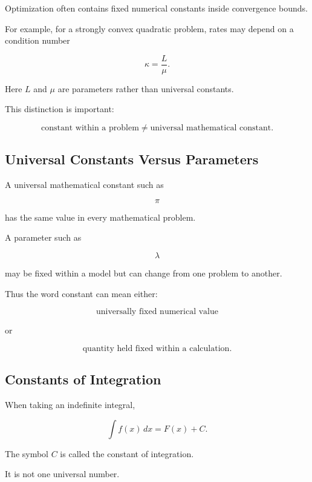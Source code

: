 Optimization often contains fixed numerical constants inside convergence
bounds.

For example, for a strongly convex quadratic problem, rates may depend on a
condition number

\[
\boxed{
\kappa
=
\frac{L}{\mu}.
}
\]

Here \(L\) and \(\mu\) are parameters rather than universal constants.

This distinction is important:

\[
\boxed{
\text{constant within a problem}
\neq
\text{universal mathematical constant}.
}
\]

\subsection{Universal Constants Versus Parameters}
\label{subsec:universal-constants-versus-parameters}

A universal mathematical constant such as

\[
\pi
\]

has the same value in every mathematical problem.

A parameter such as

\[
\lambda
\]

may be fixed within a model but can change from one problem to another.

Thus the word constant can mean either:

\[
\boxed{
\text{universally fixed numerical value}
}
\]

or

\[
\boxed{
\text{quantity held fixed within a calculation}.
}
\]

\subsection{Constants of Integration}
\label{subsec:constants-of-integration-reference}

When taking an indefinite integral,

\[
\boxed{
\int f(x)\,dx
=
F(x)+C.
}
\]

The symbol \(C\) is called the constant of integration.

It is not one universal number.

